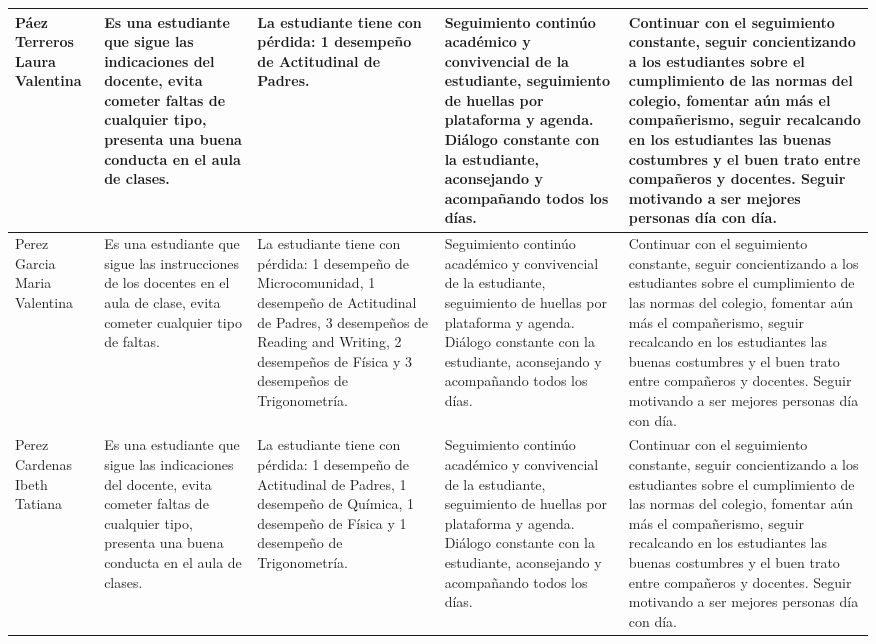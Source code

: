 \documentclass[spanish,11pt,a4paper]{article}
\begin{document}
\begin{longtable}{|p{3.5cm}|p{3.5cm}|p{3.5cm}|p{3.5cm}|p{3.5cm}|}
		Páez Terreros Laura Valentina & 
		Es una estudiante que sigue las indicaciones del docente, evita cometer faltas de cualquier tipo, presenta una buena conducta en el aula de clases. & 
		La estudiante tiene con pérdida: 1 desempeño de Actitudinal de Padres. & 
		Seguimiento continúo académico y convivencial de la estudiante, seguimiento de huellas por plataforma y agenda. Diálogo constante con la estudiante, aconsejando y acompañando todos los días. & 
		Continuar con el seguimiento constante, seguir concientizando a los estudiantes sobre el cumplimiento de las normas del colegio, fomentar aún más el compañerismo, seguir recalcando en los estudiantes las buenas costumbres y el buen trato entre compañeros y docentes. Seguir motivando a ser mejores personas día con día.\\
		\hline
		
		Perez Garcia Maria Valentina & 
		Es una estudiante que sigue las instrucciones de los docentes en el aula de clase, evita cometer cualquier tipo de faltas.  & 
		La estudiante tiene con pérdida: 1 desempeño de Microcomunidad, 1 desempeño de Actitudinal de Padres, 3 desempeños de Reading and Writing, 2 desempeños de Física y 3 desempeños de Trigonometría. & 
		Seguimiento continúo académico y convivencial de la estudiante, seguimiento de huellas por plataforma y agenda. Diálogo constante con la estudiante, aconsejando y acompañando todos los días. & 
		Continuar con el seguimiento constante, seguir concientizando a los estudiantes sobre el cumplimiento de las normas del colegio, fomentar aún más el compañerismo, seguir recalcando en los estudiantes las buenas costumbres y el buen trato entre compañeros y docentes. Seguir motivando a ser mejores personas día con día.\\
		\hline
		
		Perez Cardenas Ibeth Tatiana & 
		Es una estudiante que sigue las indicaciones del docente, evita cometer faltas de cualquier tipo, presenta una buena conducta en el aula de clases. & 
		La estudiante tiene con pérdida: 1 desempeño de Actitudinal de Padres, 1 desempeño de Química, 1 desempeño de Física y 1 desempeño de Trigonometría.	 & 
		Seguimiento continúo académico y convivencial de la estudiante, seguimiento de huellas por plataforma y agenda. Diálogo constante con la estudiante, aconsejando y acompañando todos los días. & 
		Continuar con el seguimiento constante, seguir concientizando a los estudiantes sobre el cumplimiento de las normas del colegio, fomentar aún más el compañerismo, seguir recalcando en los estudiantes las buenas costumbres y el buen trato entre compañeros y docentes. Seguir motivando a ser mejores personas día con día.\\
		\hline
		

\end{longtable}
\end{document}
